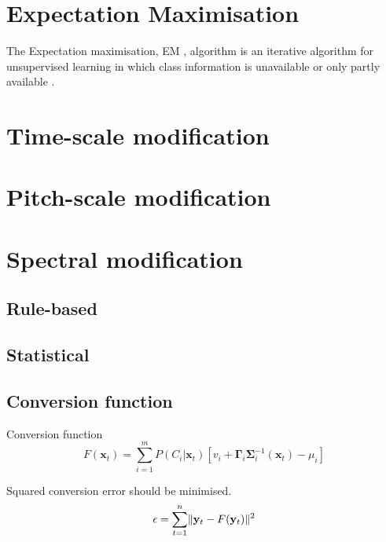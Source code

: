 \section{Expectation Maximisation} %
\label{sec:expectation_maximisation}
The Expectation maximisation, EM , algorithm is an iterative algorithm for unsupervised learning in which class information is unavailable or only partly available \cite{taletek}.

\section{Time-scale modification} %
\label{sec:time_scale_modification}


\section{Pitch-scale modification} %
\label{sec:pitch_scale_modification}


\section{Spectral modification} %
\label{sec:spectral_modification}

\subsection{Rule-based} %
\label{sub:rule_based}


\subsection{Statistical} %
\label{sub:statistical}


\subsection{Conversion function} %
\label{sub:conversion_function}
Conversion function \cite{stylianou95}
\begin{equation}
	\label{eq:conversion_function}
	F(\mathbf{x}_t) = \sum_{i=1}^{m}P(C_i \vert \mathbf{x}_t)[v_i + \boldsymbol{\Gamma}_i \mathbf{\Sigma}_i^{-1}(\mathbf{x}_t)-\mu_i]
\end{equation}

Squared conversion error should be minimised.
\begin{equation}
	\epsilon=\sum_{t=1}^{n}\lVert\mathbf{y}_t - F(\mathbf{y}_t)\rVert^2
\end{equation}
